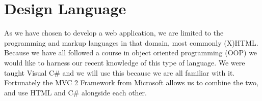 \section{Design Language}
\label{sec:design_language}
As we have chosen to develop a web application, we are limited to the programming and markup languages in that domain, most commonly (X)HTML.
Because we have all followed a course in object oriented programming (OOP) we would like to harness our recent knowledge of this type of language. We were taught Visual C\# and we will use this because we are all familiar with it.
Fortunately the MVC 2 Framework from Microsoft allows us to combine the two, and use HTML and C\# alongside each other.
